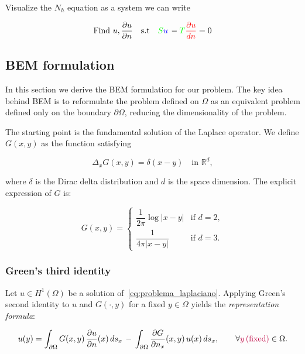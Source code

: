 \documentclass[11pt,onecolumn]{article}
\begin{document}
Visualize the $N_h$ equation as a system we can write

\begin{equation}
\begin{aligned}
&\text{Find } u,\frac{\partial u}{\partial n} \quad \text{s.t}
&{\color{green}S}{\color{blue}u}  \, - {\color{green}T}{\color{red}\frac{\partial u}{dn}} = 0
\end{aligned}
\label{eq:discrete_formulation_5}
\end{equation}

\subsection{BEM formulation}
In this section we derive the BEM formulation for our problem. The key idea behind BEM is to reformulate the problem defined on $\Omega$ as an equivalent problem defined only on the boundary $\partial\Omega$, reducing the dimensionality of the problem.

The starting point is the fundamental solution of the Laplace operator. We define $G(x,y)$ as the function satisfying

\begin{equation}
    \Delta_x G(x,y) = \delta(x-y) \quad \text{in } \mathbb{R}^d,
\label{eq:fundamental_solution}
\end{equation}

where $\delta$ is the Dirac delta distribution and $d$ is the space dimension. The explicit expression of $G$ is:

\begin{equation}
G(x,y) = 
\begin{cases}
\dfrac{1}{2\pi} \log |x - y| & \text{if } d = 2, \\[6pt]
\dfrac{1}{4\pi |x - y|} & \text{if } d = 3.
\end{cases}
\label{eq:green_function}
\end{equation}

\subsubsection{Green's third identity}
Let $u \in H^1(\Omega)$ be a solution of~\eqref{eq:problema_laplaciano}. Applying Green's second identity to $u$ and $G(\cdot, y)$ for a {\color{purple}fixed $y \in \Omega$ } yields the \textit{representation formula}:

\begin{equation}
u(y) = \int_{\partial\Omega} G(x,y)\, \frac{\partial u}{\partial n}(x)\, ds_x 
\,-\, \int_{\partial\Omega} \frac{\partial G}{\partial n_x}(x,y)\, u(x)\, ds_x, 
\qquad \forall {\color{purple} y \, \text{(fixed)}} \in \Omega.
\label{eq:representation_formula}
\end{equation}
\end{document}
